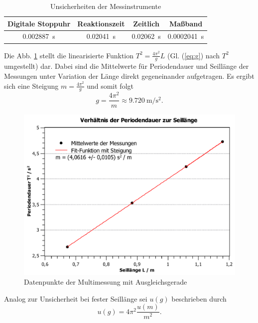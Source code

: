 \documentclass[11pt,a4paper,titlepage, ngerman]{article}
\begin{document}
			\begin{table}
			\centering
			\begin{tabular}{S|S|S||S}
				\hline
				{Digitale Stoppuhr} & {Reaktionszeit} & {Zeitlich} & {Maßband}\\
				\hline
				\SI{0,002887}{\second} & \SI{0,02041}{\second} & \SI{0,02062}{\second} & \SI{0,0002041}{\second} \\
				\hline
			\end{tabular}
			\caption{Unsicherheiten der Messinstrumente}
			\label{tab:unsicherheiten}
			\end{table}
		
			Die Abb. \ref{fig:multi} stellt die linearisierte Funktion $T^2 = \frac{4 \pi^2}{g} L$ (Gl. (\ref{eq:g}) nach $T^2$ umgestellt) dar.
			Dabei sind die Mittelwerte für Periodendauer und Seillänge der Messungen unter Variation der Länge direkt gegeneinander aufgetragen.
			Es ergibt sich eine Steigung $m = \frac{4 \pi^2}{g}$ und somit folgt
			\begin{equation}
				g = \frac{4 \pi^2}{m} \approx \SI{9,720}{\meter\per\second\squared}.
			\end{equation}
			
			\begin{figure}
				\centering
				\includegraphics[scale=0.6]{SteigungMultimessung.pdf}
				\caption{Datenpunkte der Multimessung mit Ausgleichsgerade}
				\label{fig:multi}
			\end{figure}
		
			Analog zur Unsicherheit bei fester Seillänge sei $u(g)$ beschrieben durch
			\begin{equation*}
				u(g) = 4\pi^2 \frac{u(m)}{m^2}.
			\end{equation*}
		
\end{document}
